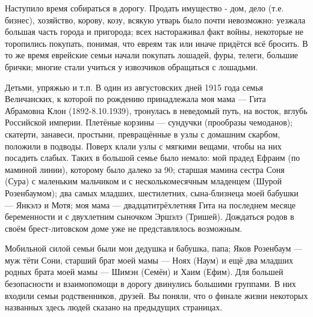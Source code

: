 Наступило время собираться в дорогу. Продать имущество - дом, дело (т.е. бизнес), хозяйство, корову, козу, всякую утварь было почти невозможно: уезжала большая часть города и пригорода; всех настораживал факт войны, некоторые не торопились покупать, понимая, что евреям так или иначе придётся всё бросить. В то же время еврейские семьи начали покупать лошадей, фуры, телеги, большие брички; многие стали учиться у извозчиков обращаться с лошадьми.

Детьми, упряжью и т.п. В один из августовских дней 1915 года семья Величанских, к которой по рождению принадлежала моя мама — Гита Абрамовна Клон (1892-8.10.1939), тронулась в неведомый путь, на восток, вглубь Российской империи. Плетёные корзины — сундучки (прообразы чемоданов); скатерти, занавеси, простыни, превращённые в узлы с домашним скарбом, положили в подводы. Поверх клали узлы с мягкими вещами, чтобы на них посадить слабых. Таких в большой семье было немало: мой прадед Ефраим (по маминой линии), которому было далеко за 90; старшая мамина сестра Соня (Сура) с маленьким мальчиком и с несколькомесячным младенцем (Шурой Розенбаумом); два самых младших, шестилетних, сына-близнеца моей бабушки — Янкэлэ и Мотя; моя мама — двадцатитрёхлетняя Гита на последнем месяце беременности и с двухлетним сыночком Эршэлэ (Тришей). Дождаться родов в своём брест-литовском доме уже не представлялось возможным.

Мобильной силой семьи были мои дедушка и бабушка, папа; Яков Розенбаум — муж тёти Сони, старший брат моей мамы — Ноях (Наум) и ещё два младших родных брата моей мамы — Шимэн (Семён) и Хаим (Ефим). Для большей безопасности и взаимопомощи в дорогу двинулись большими группами. В них входили семьи родственников, друзей. Вы поняли, что о финале жизни некоторых названных здесь людей сказано на предыдущих страницах.

